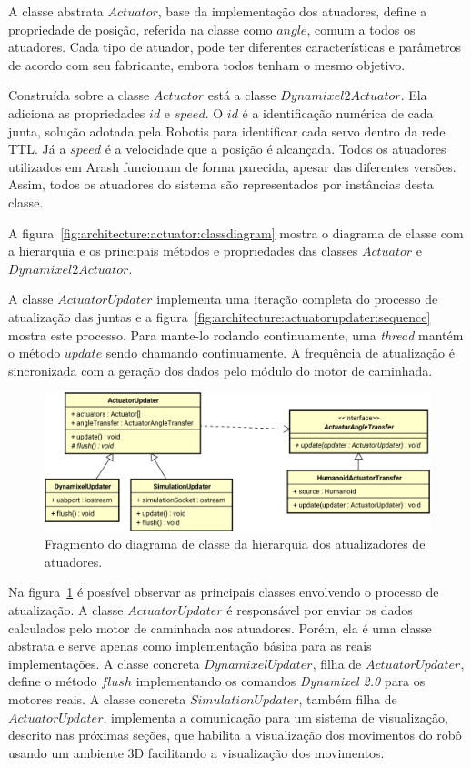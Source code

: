 A classe abstrata $Actuator$, base da implementação dos atuadores, define a propriedade de posição, referida na classe como $angle$, comum a todos os atuadores. Cada tipo de atuador, pode ter diferentes características e parâmetros de acordo com seu fabricante, embora todos tenham o mesmo objetivo.

Construída sobre a classe $Actuator$ está a classe $Dynamixel2Actuator$. Ela adiciona as propriedades $id$ e $speed$. O $id$ é a identificação numérica de cada junta, solução adotada pela Robotis para identificar cada servo dentro da rede TTL. Já a $speed$ é a velocidade que a posição é alcançada. Todos os atuadores utilizados em Arash funcionam de forma parecida, apesar das diferentes versões. Assim, todos os atuadores do sistema são representados por instâncias desta classe.

A figura~\ref{fig:architecture:actuator:classdiagram} mostra o diagrama de classe com a hierarquia e os principais métodos e propriedades das classes $Actuator$ e $Dynamixel2Actuator$.

A classe $ActuatorUpdater$ implementa uma iteração completa do processo de atualização das juntas e a figura~\ref{fig:architecture:actuatorupdater:sequence} mostra este processo. Para mante-lo rodando continuamente, uma \textit{thread} mantém o método $update$ sendo chamando continuamente. A frequência de atualização é sincronizada com a geração dos dados pelo módulo do motor de caminhada.

\begin{figure}[htb]
	\centering
	\includegraphics[scale=0.6]{imagens/svg/softwarearchitecture-actuatorupdater-classdiagram}
	\caption{Fragmento do diagrama de classe da hierarquia dos atualizadores de atuadores.}
	\label{fig:architecture:actuatorupdater:classdiagram}
\end{figure}

Na figura~\ref{fig:architecture:actuatorupdater:classdiagram} é possível observar as principais classes envolvendo o processo de atualização. A classe $ActuatorUpdater$ é responsável por enviar os dados calculados pelo motor de caminhada aos atuadores. Porém, ela é uma classe abstrata e serve apenas como implementação básica para as reais implementações. A classe concreta $DynamixelUpdater$, filha de $ActuatorUpdater$, define o método $flush$ implementando os comandos \textit{Dynamixel 2.0} \cite{dynamixel} para os motores reais. A classe concreta $SimulationUpdater$, também filha de $ActuatorUpdater$, implementa a comunicação para um sistema de visualização, descrito nas próximas seções, que habilita a visualização dos movimentos do robô usando um ambiente 3D facilitando a visualização dos movimentos.


